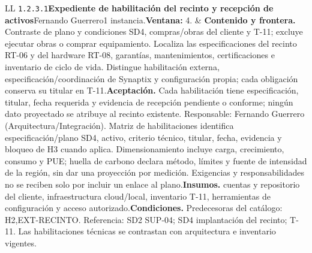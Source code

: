 \begin{longtable}{L{\tabcolsep\relax}L{\tabcolsep\relax}}
\texttt{1.\allowbreak{}2.\allowbreak{}3.\allowbreak{}1}\newline{}\textbf{Expediente de habilitación del recinto y recepción de activos}\newline{}Fernando Guerrero\newline{}1 instancia.\newline{}\textbf{Ventana:} 4. & \textbf{Contenido y frontera.} Contraste de plano y condiciones SD4, compras/obras del cliente y T-11; excluye ejecutar obras o comprar equipamiento. Localiza las especificaciones del recinto RT-06 y del hardware RT-08, garantías, mantenimientos, certificaciones e inventario de ciclo de vida. Distingue habilitación externa, especificación/coordinación de Synaptix y configuración propia; cada obligación conserva su titular en T-11.\newline{}\textbf{Aceptación.} Cada habilitación tiene especificación, titular, fecha requerida y evidencia de recepción pendiente o conforme; ningún dato proyectado se atribuye al recinto existente. Responsable: Fernando Guerrero (Arquitectura/Integración). Matriz de habilitaciones identifica especificación/plano SD4, activo, criterio técnico, titular, fecha, evidencia y bloqueo de H3 cuando aplica. Dimensionamiento incluye carga, crecimiento, consumo y PUE; huella de carbono declara método, límites y fuente de intensidad de la región, sin dar una proyección por medición. Exigencias y responsabilidades no se reciben solo por incluir un enlace al plano.\newline{}\textbf{Insumos.} cuentas y repositorio del cliente, infraestructura cloud/local, inventario T-11, herramientas de configuración y acceso autorizado.\newline{}\textbf{Condiciones.} Predecesoras del catálogo: H2,EXT-RECINTO. Referencia: SD2 SUP-04; SD4 implantación del recinto; T-11. Las habilitaciones técnicas se contrastan con arquitectura e inventario vigentes.\\\hline

\end{longtable}
